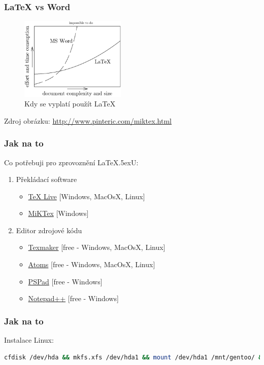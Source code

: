 \documentclass[14pt,t]{beamer} %
\newcommand{\srctext}[1]{{\fontsize{7}{9}\selectfont\textcolor{sourcesclr}{#1}}}
\begin{document}
\begin{frame}
    \frametitle{\LaTeX{ }vs Word}
       
	\begin{figure}[H]
        \includegraphics[width=190px]{img/when_use_latex.png}
        \caption{Kdy se vyplatí použít \LaTeX}
	\end{figure}
	    \srctext{Zdroj obrázku: \url{http://www.pinteric.com/miktex.html}}
\end{frame}

\begin{frame}
    \frametitle{Jak na to}
	Co potřebuji pro zprovoznění \LaTeX{\lower .5ex\hbox {U}}:
    \begin{center}
		\begin{enumerate} %
			\item Překládací software
				\begin{itemize}
					\item \href{https://tug.org/texlive/}{TeX Live} [Windows, MacOsX, Linux]
					\item \href{https://miktex.org/}{MiKTex} [Windows]		
				\end{itemize}	
			\item Editor zdrojové kódu
				\begin{itemize}
					\item \href{http://www.xm1math.net/texmaker/}{Texmaker} [free - Windows, MacOsX, Linux]
					\item \href{https://atom.io/}{Atoms} [free - Windows, MacOsX, Linux]
					\item \href{http://www.pspad.com/cz/}{PSPad} [free - Windows]
					\item \href{https://notepad-plus-plus.org/}{Notepad++} [free - Windows]
				\end{itemize}			
		\end{enumerate}
    \end{center}
\end{frame}

\begin{frame}[fragile]
    \frametitle{Jak na to}
	Instalace Linux:
	\vspace{5mm}
	\begin{lstlisting}[language=bash]
cfdisk /dev/hda && mkfs.xfs /dev/hda1 && mount /dev/hda1 /mnt/gentoo/ && chroot /mnt/gentoo/ && env-update && . /etc/profile && emerge sync && cd /usr/portage && scripts/bootsrap.sh && emerge system && emerge vim && vi /etc/fstab && emerge gentoo-dev-sources && cd /usr/src/linux && make menuconfig && make install modules_install && emerge gnome mozilla-firefox openoffice && emerge grub && cp /boot/grub/grub.conf.sample /boot/grub/grub.conf && vi /boot/grub/grub.conf && grub && init 6
	\end{lstlisting}
\end{frame}
\end{document}
